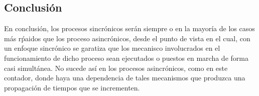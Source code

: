 \subsection{Conclusi\'on}
En conclusi\'on, los procesos sincr\'onicos ser\'an siempre o en la mayor\'ia de los casos m\'as r\'paidos que los proceso asincr\'onicos,
desde el punto de vista en el cual, con un enfoque sincr\'onico se garatiza que los mecanisco involucrados en el funcionamiento de dicho proceso
sean ejecutados o puestos en marcha de forma casi simult\'anea. No sucede as\'i en los procesos asincr\'onicos, como en este contador, donde haya 
una dependencia de tales mecanismos que produzca una propagaci\'on de tiempos que se incrementen.
